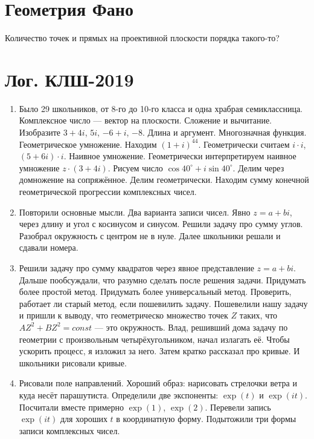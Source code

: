 \documentclass[12pt]{article}
\theoremstyle{definition}
\begin{document}
\newpage
\section{Геометрия Фано}


Количество точек и прямых на проективной плоскости порядка такого-то?




\section{Лог. КЛШ-2019}

\begin{enumerate}
  \item Было 29 школьников, от 8-го до 10-го класса и одна храбрая семиклассница. Комплексное число — вектор на плоскости.
  Сложение и вычитание. Изобразите $3+4i$, $5i$, $-6 + i$, $-8$. Длина и аргумент. Многозначная функция. 
  Геометрическое умножение. Находим $(1+i)^{44}$. Геометрически считаем $i \cdot i$, $(5 + 6i) \cdot i$. Наивное умножение.
  Геометрически интерпретируем наивное умножение $z \cdot (3 + 4i)$.
  Рисуем число $\cos 40^{\circ} + i \sin 40^{\circ}$. Делим через домножение на сопряжённое.
  Делим геометрически. Находим сумму конечной геометрической прогрессии комплексных чисел. 
  \item Повторили основные мысли. Два варианта записи чисел. Явно $z=a + bi$, через длину и угол с косинусом и синусом.
  Решили задачу про сумму углов. Разобрал окружность с центром не в нуле. Далее школьники решали и сдавали номера.
  \item Решили задачу про сумму квадратов через явное представление $z=a+bi$.
  Дальше пообсуждали, что разумно сделать после решения задачи. 
  Придумать более простой метод. Придумать более универсальный метод. 
  Проверить, работает ли старый метод, если пошевилить задачу.
  Пошевелили нашу задачу и пришли к выводу, что геометрическо множество точек $Z$ таких, что
  $AZ^2 + BZ^2 = const$ — это окружность. 
  Влад, решивший дома задачу по геометрии с произвольным четырёхугольником, начал излагать её. 
  Чтобы ускорить процесс, я изложил за него. Затем кратко рассказал про кривые. 
  И школьники рисовали кривые. 
  \item Рисовали поле направлений. Хороший образ: нарисовать стрелочки ветра и куда несёт парашутиста. 
  Определили две экспоненты: $\exp(t)$ и $\exp(it)$. Посчитали вместе примерно $\exp(1)$, $\exp(2)$.
  Перевели запись $\exp(it)$ для хороших $t$ в координатную форму. Подытожили три формы записи комплексных чисел. 

\end{enumerate}
\end{document}
